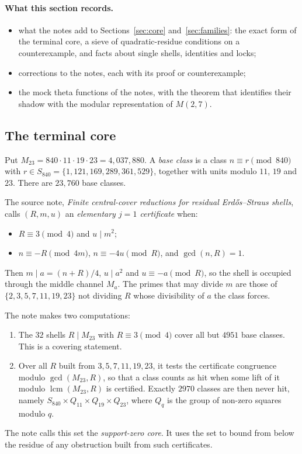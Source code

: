 \paragraph{What this section records.}
\begin{itemize}
\item what the notes add to Sections~\ref{sec:core} and~\ref{sec:families}: the exact form of the terminal core, a sieve of quadratic-residue conditions on a counterexample, and facts about single shells, identities and locks;
\item corrections to the notes, each with its proof or counterexample;
\item the mock theta functions of the notes, with the theorem that identifies their shadow with the modular representation of $M(2,7)$.
\end{itemize}

\subsection{The terminal core}\label{ssec:termcore}

Put $M_{23}=840\cdot11\cdot19\cdot23=4{,}037{,}880$. A \emph{base class} is a class $n\equiv r\pmod{840}$ with $r\in S_{840}=\{1,121,169,289,361,529\}$, together with units modulo $11$, $19$ and $23$. There are $23{,}760$ base classes.

The source note, \emph{Finite central-cover reductions for residual Erdős--Straus shells}, calls $(R,m,u)$ an \emph{elementary $j=1$ certificate} when:
\begin{itemize}
\item $R\equiv3\pmod4$ and $u\mid m^2$;
\item $n\equiv-R\pmod{4m}$, $n\equiv-4u\pmod R$, and $\gcd(n,R)=1$.
\end{itemize}
Then $m\mid a=(n+R)/4$, $u\mid a^2$ and $u\equiv-a\pmod R$, so the shell is occupied through the middle channel $M_a$. The primes that may divide $m$ are those of $\{2,3,5,7,11,19,23\}$ not dividing $R$ whose divisibility of $a$ the class forces.

The note makes two computations:
\begin{enumerate}[label=(\roman*)]
\item The $32$ shells $R\mid M_{23}$ with $R\equiv3\pmod4$ cover all but $4951$ base classes. This is a covering statement.
\item Over all $R$ built from $3,5,7,11,19,23$, it tests the certificate congruence modulo $\gcd(M_{23},R)$, so that a class counts as hit when some lift of it modulo $\operatorname{lcm}(M_{23},R)$ is certified. Exactly $2970$ classes are then never hit, namely $S_{840}\times Q_{11}\times Q_{19}\times Q_{23}$, where $Q_q$ is the group of non-zero squares modulo $q$.
\end{enumerate}
The note calls this set the \emph{support-zero core}. It uses the set to bound from below the residue of any obstruction built from such certificates.

